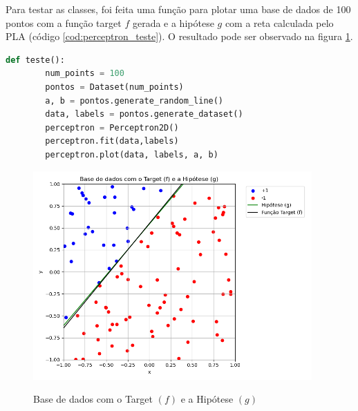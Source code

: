 Para testar as classes, foi feita uma função para plotar uma base de dados de 100 pontos com a função target $f$ gerada e a hipótese $g$ com a reta calculada pelo PLA (código \ref{cod:perceptron_teste}). O resultado pode ser observado na figura \ref{fig:perceptron_plot}. 

\begin{lstlisting}[language=Python, caption=Teste das classes, label=cod:perceptron_teste]
    def teste():
        num_points = 100
        pontos = Dataset(num_points)
        a, b = pontos.generate_random_line()
        data, labels = pontos.generate_dataset()
        perceptron = Perceptron2D()
        perceptron.fit(data,labels)
        perceptron.plot(data, labels, a, b)
\end{lstlisting}

\begin{figure}[H]
    \caption{Base de dados com o Target $(f)$ e a Hipótese $(g)$}
       \centering
       \includegraphics[height=8cm]{perceptron_plot.png}
    \label{fig:perceptron_plot}
\end{figure}



